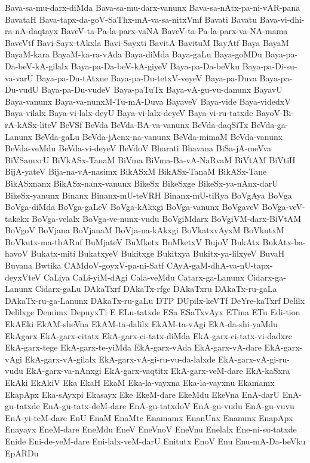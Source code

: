 {Bava-sa-mu-darx-diMda
Bava-sa-mu-darx-vanunx
Bava-sa-nAtx-pa-ni-vAR-pana
BavataH
Bava-tapx-da-goV-SaThx-mA-va-sa-nitxVmf
Bavati
Bavatu
Bava-vi-dhi-ra-nA-daqtayx
BaveV-ta-Pa-la-parx-vaNA
BaveV-ta-Pa-la-parx-va-NA-mama
BaveVtf
Bavi-Sayx-tAkxla
Bavi-Sayxti
BavitA
BavituM
BayAtf
Baya
BayaM
BayaM-kara
BayaM-ka-ra-vAda
Baya-diMda
Baya-gaLu
Baya-goMDu
Baya-pa-Da-beV-kA-gilalx
Baya-pa-Da-beV-kA-giyeV
Baya-pa-Da-beVku
Baya-pa-Di-su-va-varU
Baya-pa-Du-tAtxne
Baya-pa-Du-tetxV-veyeV
Baya-pa-Duva
Baya-pa-Du-vudU
Baya-pa-Du-vudeV
Baya-paTuTx
Baya-vA-gu-vu-danunx
BayavU
Baya-vanunx
Baya-va-nunxM-Tu-mA-Duva
BayaveV
Baya-vide
Baya-videdxV
Baya-vilalx
Baya-vi-lalx-deyU
Baya-vi-lalx-deyeV
Baya-vi-ru-tatxde
BayoV-Bi-rA-kASx-liteV
BeVSf
BeVda
BeVda-BA-va-vanunx
BeVda-daqSiTx
BeVda-ga-Lanunx
BeVda-gaLu
BeVda-jAcnx-na-vanunx
BeVda-mimaM
BeVda-vanunx
BeVda-veMdu
BeVda-vi-deyeV
BeVdoV
Bharati
Bhavana
BiSa-jA-meVva
BiVSamxrU
BiVkASx-TanaM
BiVma
BiVma-Ba-vA-NaRvaM
BiVtAM
BiVtiH
BijA-yateV
Bija-na-vA-nasimx
BikASxM
BikASx-TanaM
BikASx-Tane
BikASxnanx
BikASx-nanx-vanunx
BikeSx
BikeSxge
BikeSx-ya-nAnx-darU
BikeSx-yanunx
Binanx
Binanx-mU-teVRH
Binanx-mU-tiRya
BoVgAya
BoVga
BoVga-diMda
BoVga-gaLeV
BoVga-kAkxgi
BoVga-vanunx
BoVgaveV
BoVga-veV-takekx
BoVga-velalx
BoVga-ve-nunx-vudu
BoVgiMdarx
BoVgiVM-darx-BiVtAM
BoVgoV
BoVjana
BoVjanaM
BoVja-na-kAkxgi
BoVkatxvAyxM
BoVkutxM
BoVkutx-ma-thARnf
BuMjateV
BuMketx
BuMketxV
BujoV
BukAtx
BukAtx-ba-havoV
Bukatx-miti
BukatxyeV
Bukitxge
Bukitxya
Bukitx-ya-lilxyeV
BuvaH
Buvana
Bwtika
CAMdoV-goyxV-pa-ni-Satf
CAyA-gaM-dhA-va-nU-tapx-deyxVteV
CaLiya
CaLi-yiM-dAgi
Cala-veMdu
Catarx-ga-Lanunx
Cidarx-ga-Lanunx
Cidarx-gaLu
DAkaTxrf
DAkaTx-rfge
DAkaTxru
DAkaTx-ru-gaLa
DAkaTx-ru-ga-Lanunx
DAkaTx-ru-gaLu
DTP
DUpilx-keVTf
DeYre-kaTxrf
Delilx
Delilxge
Demimx
DepuyxTi
E
ELu-tatxde
ESa
ESaTxvAyx
ETina
ETu
Edi-tion
EkAEki
EkAM-sheVna
EkAM-ta-dalilx
EkAM-ta-vAgi
EkA-da-shi-yaMdu
EkAgarx
EkA-garx-citatx
EkA-garx-ci-tatx-diMda
EkA-garx-ci-tatx-vi-dadxre
EkA-garx-tege
EkA-garx-te-yiMda
EkA-garx-vAda
EkA-garx-vA-dare
EkA-garx-vAgi
EkA-garx-vA-gilalx
EkA-garx-vA-gi-ru-vu-da-lalxde
EkA-garx-vA-gi-ru-vudu
EkA-garx-va-nAnxgi
EkA-garx-vaqtitx
EkA-garx-veM-dare
EkA-kaSxra
EkAki
EkAkiV
Eka
EkaH
EkaM
Eka-la-vayxna
Eka-la-vayxnu
Ekamamx
EkapApx
Eka-sAyxpi
Ekasayx
Eke
EkeM-dare
EkeMdu
EkeVna
EnA-darU
EnA-gu-tatxde
EnA-gu-tatx-deM-dare
EnA-gu-tatxdoV
EnA-gu-vudu
EnA-gu-vuvu
EnA-yi-teM-dare
EnU
EnaM
EnaMte
Enamamx
EnanUnx
Enanunx
EnapApx
Enayayx
EneM-dare
EneMdu
EneV
EneVnoV
EneVnu
Enelalx
Ene-ni-su-tatxde
Enide
Eni-de-yeM-dare
Eni-lalx-veM-darU
Enitutx
EnoV
Enu
Enu-mA-Da-beVku
EpARDu
}
